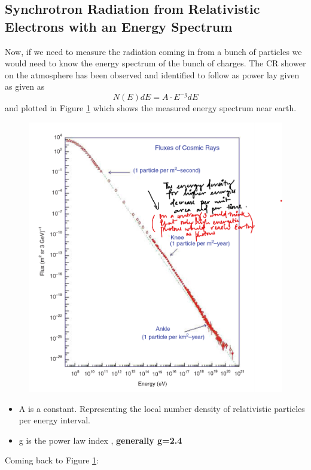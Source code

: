 \documentclass[12pt]{report}
\begin{document}
\subsection{Synchrotron Radiation from Relativistic Electrons with an Energy Spectrum}
Now, if we need to measure the radiation coming in from a bunch of particles we would need to know the energy spectrum of the bunch of charges. The CR shower on the atmosphere has been observed and identified to follow as power lay given as given as
\begin{equation}
N(E)dE=A\cdot E^{-g}dE
\end{equation}
and plotted in Figure \ref{figepower} which shows the measured energy spectrum near earth.
\begin{figure}\label{figepower}
\includegraphics[scale=1]{figepower.png}
\end{figure}
\begin{itemize}
\item A is a constant. Representing the local number density of relativistic particles per energy interval.
\item g is the power law index , \textbf{generally g=2.4}
\end{itemize}
Coming back to Figure \ref{figepower}:
\end{document}

